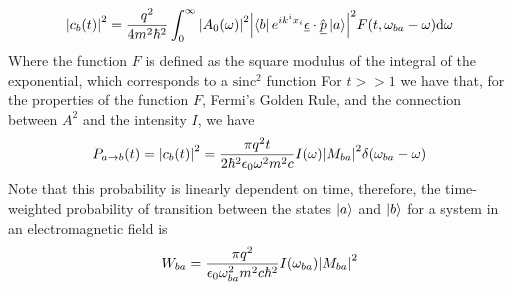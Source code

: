 \documentclass[../qm.tex]{subfiles}
\begin{document}
	\begin{equation}
		\abs{c_b(t)}^2=\frac{q^2}{4m^2\hbar^2}\int_{0}^\infty\abs{A_0(\omega)}^2\abs{\bra{b}e^{ik^ix_i}\underline{\epsilon}\cdot\hat{\underline{p}}\ket{a}}^2F(t,\omega_{ba}-\omega)\dd\omega
		\label{eq:transprob}
	\end{equation}
	Where the function $F$ is defined as the square modulus of the integral of the exponential, which corresponds to a $\mathrm{sinc^2}$ function
	For $t>>1$ we have that, for the properties of the function $F$, Fermi's Golden Rule, and the connection between $A^2$ and the intensity $I$, we have
	\begin{equation}
		P_{a\to b}(t)=\abs{c_b(t)}^2=\frac{\pi q^2t}{2\hbar^2\epsilon_0\omega^2m^2c}I(\omega)\abs{M_{ba}}^2\delta(\omega_{ba}-\omega)
		\label{eq:transprobfermi}
	\end{equation}
	Note that this probability is linearly dependent on time, therefore, the time-weighted probability of transition between the states $\ket{a}$ and $\ket{b}$ for a system in an electromagnetic field is
	\begin{equation}
		W_{ba}=\frac{\pi q^2}{\epsilon_0\omega_{ba}^2m^2c\hbar^2}I(\omega_{ba})\abs{M_{ba}}^2
		\label{eq:perttransem}
	\end{equation}
\end{document}
